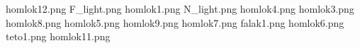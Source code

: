 homlok12.png
F_light.png
homlok1.png
N_light.png
homlok4.png
homlok3.png
homlok8.png
homlok5.png
homlok9.png
homlok7.png
falak1.png
homlok6.png
teto1.png
homlok11.png
